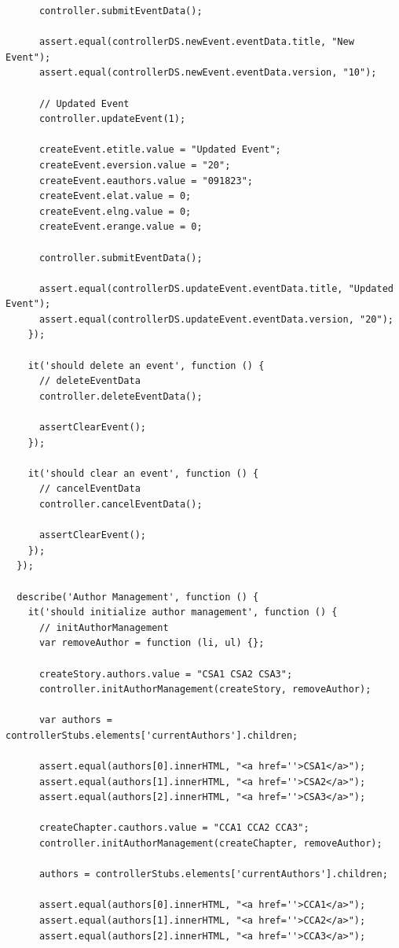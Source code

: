 \documentclass[12pt]{ucthesis}
\begin{document}
\begin{lstlisting}
      controller.submitEventData();

      assert.equal(controllerDS.newEvent.eventData.title, "New Event");
      assert.equal(controllerDS.newEvent.eventData.version, "10");

      // Updated Event
      controller.updateEvent(1);

      createEvent.etitle.value = "Updated Event";
      createEvent.eversion.value = "20";
      createEvent.eauthors.value = "091823";
      createEvent.elat.value = 0;
      createEvent.elng.value = 0;
      createEvent.erange.value = 0;

      controller.submitEventData();

      assert.equal(controllerDS.updateEvent.eventData.title, "Updated Event");
      assert.equal(controllerDS.updateEvent.eventData.version, "20");
    });

    it('should delete an event', function () {
      // deleteEventData
      controller.deleteEventData();

      assertClearEvent();
    });

    it('should clear an event', function () {
      // cancelEventData
      controller.cancelEventData();

      assertClearEvent();
    });
  });

  describe('Author Management', function () {
    it('should initialize author management', function () {
      // initAuthorManagement
      var removeAuthor = function (li, ul) {};

      createStory.authors.value = "CSA1 CSA2 CSA3";
      controller.initAuthorManagement(createStory, removeAuthor);

      var authors = controllerStubs.elements['currentAuthors'].children;

      assert.equal(authors[0].innerHTML, "<a href=''>CSA1</a>");
      assert.equal(authors[1].innerHTML, "<a href=''>CSA2</a>");
      assert.equal(authors[2].innerHTML, "<a href=''>CSA3</a>");

      createChapter.cauthors.value = "CCA1 CCA2 CCA3";
      controller.initAuthorManagement(createChapter, removeAuthor);

      authors = controllerStubs.elements['currentAuthors'].children;

      assert.equal(authors[0].innerHTML, "<a href=''>CCA1</a>");
      assert.equal(authors[1].innerHTML, "<a href=''>CCA2</a>");
      assert.equal(authors[2].innerHTML, "<a href=''>CCA3</a>");


\end{lstlisting}
\end{document}
